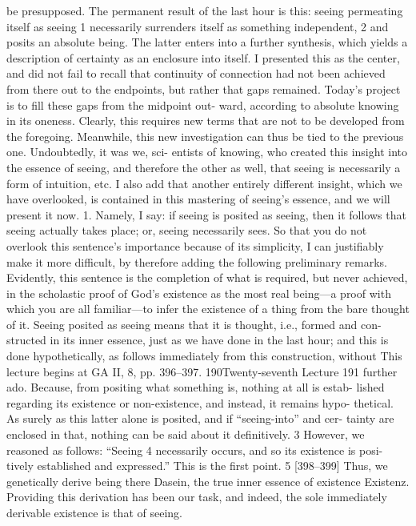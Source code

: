 be presupposed.
The permanent result of the last hour is this: seeing permeating itself as
seeing 1 necessarily surrenders itself as something independent, 2 and posits an
absolute being. The latter enters into a further synthesis, which yields a
description of certainty as an enclosure into itself.
I presented this as the center, and did not fail to recall that continuity of
connection had not been achieved from there out to the endpoints, but rather
that gaps remained. Today’s project is to fill these gaps from the midpoint out-
ward, according to absolute knowing in its oneness. Clearly, this requires new
terms that are not to be developed from the foregoing. Meanwhile, this new
investigation can thus be tied to the previous one. Undoubtedly, it was we, sci-
entists of knowing, who created this insight into the essence of seeing, and
therefore the other as well, that seeing is necessarily a form of intuition, etc. I
also add that another entirely different insight, which we have overlooked, is
contained in this mastering of seeing’s essence, and we will present it now.
1. Namely, I say: if seeing is posited as seeing, then it follows that seeing
actually takes place; or, seeing necessarily sees. So that you do not overlook this
sentence’s importance because of its simplicity, I can justifiably make it more
difficult, by therefore adding the following preliminary remarks. Evidently,
this sentence is the completion of what is required, but never achieved, in the
scholastic proof of God’s existence as the most real being—a proof with which
you are all familiar—to infer the existence of a thing from the bare thought of
it. Seeing posited as seeing means that it is thought, i.e., formed and con-
structed in its inner essence, just as we have done in the last hour; and this is
done hypothetically, as follows immediately from this construction, without
This lecture begins at GA II, 8, pp. 396–397.
190Twenty-seventh Lecture
191
further ado. Because, from positing what something is, nothing at all is estab-
lished regarding its existence or non-existence, and instead, it remains hypo-
thetical. As surely as this latter alone is posited, and if “seeing-into” and cer-
tainty are enclosed in that, nothing can be said about it definitively. 3 However,
we reasoned as follows: “Seeing 4 necessarily occurs, and so its existence is posi-
tively established and expressed.” This is the first point. 5
[398–399] Thus, we genetically derive being there {Dasein}, the true
inner essence of existence {Existenz}. Providing this derivation has been our
task, and indeed, the sole immediately derivable existence is that of seeing.
